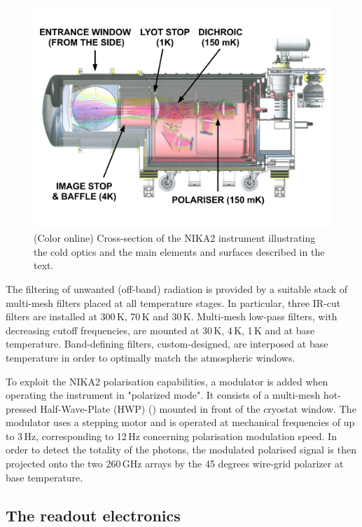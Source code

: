 \documentclass[]{aa} %
\begin{document}
\begin{figure}[h]
   \centering
   \includegraphics[width=.95\linewidth]{NIKA2_optics.pdf}
      \caption{(Color online) Cross-section of the NIKA2 instrument illustrating the cold optics and the main elements and surfaces described in the text.}
         \label{Cryostat_optics}
\end{figure}

The filtering of unwanted (off-band) radiation is provided by a suitable stack of multi-mesh filters placed at all temperature stages. In particular, three IR-cut filters are installed at 300\,K, 70\,K and 30\,K. Multi-mesh low-pass filters, with decreasing cutoff frequencies, are mounted at 30\,K, 4\,K, 1\,K and at base temperature. Band-defining filters, custom-designed, are interposed at base temperature in order to optimally match the atmospheric windows. 

To exploit the NIKA2 polarisation capabilities, a modulator is added when operating the instrument in "polarized mode". It consists of a multi-mesh hot-pressed Half-Wave-Plate (HWP) (\cite{Pisano2016}) mounted in front of the cryostat window. The modulator uses a stepping motor and is operated at mechanical frequencies of up to 3\,Hz, corresponding to 12\,Hz concerning polarisation modulation speed. In order to detect the totality of the photons, the modulated polarised signal is then projected onto the two 260\,GHz arrays by the 45 degrees wire-grid polarizer at base temperature.  


 \subsection{The readout electronics}
\end{document}
